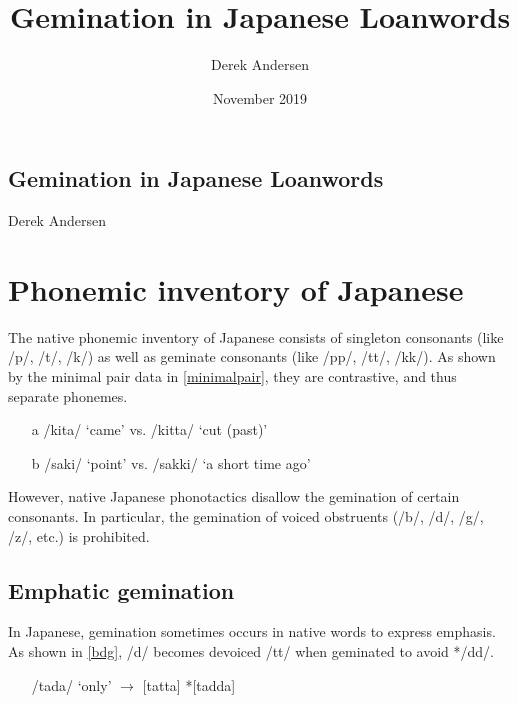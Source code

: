 \documentclass{article}
\title{Gemination in Japanese Loanwords}
\author{Derek Andersen}
\date{November 2019}
\begin{document}
\begin{center}
    \section*{Gemination in Japanese Loanwords}
    Derek Andersen
\end{center}


\section{Phonemic inventory of Japanese}

The native phonemic inventory of Japanese consists of singleton consonants (like /p/, /t/, /k/) as well as geminate consonants (like /pp/, /tt/, /kk/). As shown by the minimal pair data in \ref{minimalpair}, they are contrastive, and thus separate phonemes. \citep[p. 2]{Kubozono2009}

\begin{exe}
    \ex
    \label{minimalpair}
    \begin{itemize}
        \item [a] /kita/ ‘came' vs. /kitta/ ‘cut (past)'
        \item [b] /saki/ ‘point' vs. /sakki/ ‘a short time ago'
    \end{itemize}
    
\end{exe}

However, native Japanese phonotactics disallow the gemination of certain consonants. In particular, the gemination of voiced obstruents (/b/, /d/, /g/, /z/, etc.) is prohibited.

\subsection{Emphatic gemination}

In Japanese, gemination sometimes occurs in native words to express emphasis. As shown in \ref{bdg}, /d/ becomes devoiced /tt/ when geminated to avoid */dd/. \citep[p. 3]{Kubozono2009}

\begin{exe}
    \ex
    \label{bdg}
    \begin{itemize}
        \item [] /tada/ ‘only' $\rightarrow$ [tatta] \hspace{1cm} *[tadda]
    \end{itemize}
\end{exe}
\end{document}
